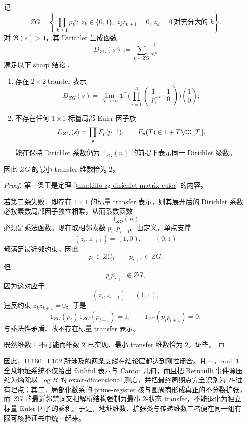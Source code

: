 \begin{theorem}\label{thm:conclusion-zg-minimal-transfer-dimension-two}
记
\[
ZG=
\left\{
\prod_{k\ge 1}p_k^{z_k}:\ z_k\in\{0,1\},\ z_kz_{k+1}=0,\ z_k=0\ \text{对充分大的 }k
\right\}.
\]
对 \(\Re(s)>1\)，其 Dirichlet 生成函数
\[
D_{ZG}(s):=\sum_{n\in ZG}\frac{1}{n^s}
\]
满足以下 sharp 结论：
\begin{enumerate}
  \item 存在 \(2\times 2\) transfer 表示
  \[
  D_{ZG}(s)
  =
  \lim_{N\to\infty}
  \mathbf 1^\top
  \Biggl(
  \prod_{i=1}^{N}
  \begin{pmatrix}
  1&1\\
  p_i^{-s}&0
  \end{pmatrix}
  \Biggr)
  \binom10;
  \]
  \item 不存在任何 \(1\times 1\) 标量局部 Euler 因子族
  \[
  D_{ZG}(s)=\prod_{p}F_p(p^{-s}),
  \qquad
  F_p(T)\in 1+T\CC[[T]],
  \]
  能在保持 Dirichlet 系数仍为 \(1_{ZG}(n)\) 的前提下表示同一 Dirichlet 级数。
\end{enumerate}
因此 \(ZG\) 的最小 transfer 维数恰为 \(2\)。
\end{theorem}
\begin{proof}
第一条正是定理 \ref{thm:killo-zg-dirichlet-matrix-euler} 的内容。

若第二条失败，即存在 \(1\times 1\) 的标量 transfer 表示，则其展开后的 Dirichlet 系数必按素数局部因子独立相乘，从而系数函数
\[
1_{ZG}(n)
\]
必须是乘法函数。现在取相邻素数 \(p_i,p_{i+1}\)。由定义，单点支撑
\[
(z_i,z_{i+1})=(1,0),\qquad (0,1)
\]
都满足最近邻约束，因此
\[
p_i\in ZG,
\qquad
p_{i+1}\in ZG.
\]
但
\[
p_ip_{i+1}\notin ZG,
\]
因为这对应于
\[
(z_i,z_{i+1})=(1,1),
\]
违反约束 \(z_kz_{k+1}=0\)。于是
\[
1_{ZG}(p_i)\,1_{ZG}(p_{i+1})=1,
\qquad
1_{ZG}(p_ip_{i+1})=0,
\]
与乘法性矛盾。故不存在标量 transfer 表示。

既然维数 \(1\) 不可能而维数 \(2\) 已实现，最小 transfer 维数恰为 \(2\)。证毕。
\end{proof}

\noindent
因此，H.160--H.162 所涉及的两条支线在结论层都达到刚性闭合。其一，rank-\(1\) 全息地址系统不仅给出 faithful 表示与 Cantor 几何，而且把 Bernoulli 事件源压缩为熵除以 \(\log B\) 的 exact-dimensional 测度，并把最终周期点完全识别为 \(B\)-进有理点；其二，局部化数系的 prime-register 核与圆周商形成真正的不分裂扩张，而 \(ZG\) 的最近邻禁词又把解析结构强制为最小 \(2\)-状态 transfer，不能退化为独立标量 Euler 因子的乘积。于是，地址维数、扩张类与传递维数三者便在同一组有限可核验证书中统一起来。

\endinput
